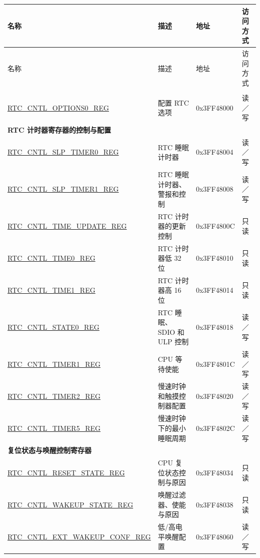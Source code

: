 \label{sec:lowpowm-reg-summ}
\begin{longtable}{ | p{6.5cm} | p{5cm} | p{2cm} | p{2cm} | }
\hline\rowcolor{lightgray}
名称 & 描述 & 地址 & 访问方式  \\ \hline
\endfirsthead
\hline\rowcolor{lightgray}
名称 & 描述 & 地址 & 访问方式  \\ \hline
\endhead
\hline
\endfoot
\hline
\multicolumn{4}{|l|}{\textbf{RTC 选项寄存器}} \\ \hline
\hyperref[regdesc:RTCCNTLOPTIONS0REG]{RTC\_CNTL\_OPTIONS0\_REG} & 配置 RTC 选项 & 0x3FF48000 & 读／写 \\ \hline
\multicolumn{4}{|l|}{\textbf{RTC 计时器寄存器的控制与配置}} \\ \hline
\hyperref[regdesc:RTCCNTLSLPTIMER0REG]{RTC\_CNTL\_SLP\_TIMER0\_REG} & RTC 睡眠计时器 & 0x3FF48004 & 读／写 \\ \hline
\hyperref[regdesc:RTCCNTLSLPTIMER1REG]{RTC\_CNTL\_SLP\_TIMER1\_REG} & RTC 睡眠计时器、警报和控制 & 0x3FF48008 & 读／写 \\ \hline
\hyperref[regdesc:RTCCNTLTIMEUPDATEREG]{RTC\_CNTL\_TIME\_UPDATE\_REG} & RTC 计时器的更新控制 & 0x3FF4800C & 只读 \\ \hline
\hyperref[regdesc:RTCCNTLTIME0REG]{RTC\_CNTL\_TIME0\_REG} & RTC 计时器低 32 位 & 0x3FF48010 & 只读 \\ \hline
\hyperref[regdesc:RTCCNTLTIME1REG]{RTC\_CNTL\_TIME1\_REG} & RTC 计时器高 16 位 & 0x3FF48014 & 只读 \\ \hline
\hyperref[regdesc:RTCCNTLSTATE0REG]{RTC\_CNTL\_STATE0\_REG} & RTC 睡眠、SDIO 和 ULP 控制 & 0x3FF48018 & 读／写 \\ \hline
\hyperref[regdesc:RTCCNTLTIMER1REG]{RTC\_CNTL\_TIMER1\_REG} & CPU 等待使能 & 0x3FF4801C & 读／写 \\ \hline
\hyperref[regdesc:RTCCNTLTIMER2REG]{RTC\_CNTL\_TIMER2\_REG} & 慢速时钟和触摸控制器配置 & 0x3FF48020 & 读／写 \\ \hline
\hyperref[regdesc:RTCCNTLTIMER5REG]{RTC\_CNTL\_TIMER5\_REG} & 慢速时钟下的最小睡眠周期 & 0x3FF4802C & 读／写 \\ \hline
\multicolumn{4}{|l|}{\textbf{复位状态与唤醒控制寄存器}} \\ \hline
\hyperref[regdesc:RTCCNTLRESETSTATEREG]{RTC\_CNTL\_RESET\_STATE\_REG} & CPU 复位状态控制与原因 & 0x3FF48034 & 只读\\ \hline
\hyperref[regdesc:RTCCNTLWAKEUPSTATEREG]{RTC\_CNTL\_WAKEUP\_STATE\_REG} & 唤醒过滤器、使能与原因 & 0x3FF48038 & 只读\\ \hline
\hyperref[regdesc:RTCCNTLEXTWAKEUPCONFREG]{RTC\_CNTL\_EXT\_WAKEUP\_CONF\_REG} & 低/高电平唤醒配置 & 0x3FF48060 & 读／写 \\ \hline

\end{longtable}
